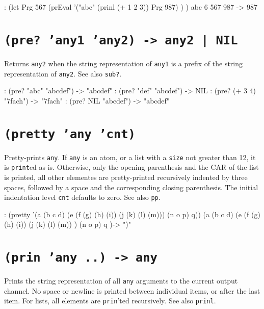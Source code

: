 \begin{wideverbatim}
: (let Prg 567
   (prEval
      '("abc" (prinl (+ 1 2 3)) Prg 987) ) )
abc
6
567
987
-> 987
\end{wideverbatim}

 
\section*{\texttt{(pre? 'any1 'any2) -> any2 | NIL}}
\label{sec:func-ref-P-(pre? 'any1 'any2) -> any2 | NIL}


Returns \texttt{any2} when the string representation of \texttt{any1} is a prefix of
the string representation of \texttt{any2}. See also \texttt{sub?}.


\begin{wideverbatim}
: (pre? "abc" "abcdef")
-> "abcdef"
: (pre? "def" "abcdef")
-> NIL
: (pre? (+ 3 4) "7fach")
-> "7fach"
: (pre? NIL "abcdef")
-> "abcdef"
\end{wideverbatim}

 
\section*{\texttt{(pretty 'any 'cnt)}}
\label{sec:func-ref-P-(pretty 'any 'cnt)}


Pretty-prints \texttt{any}. If \texttt{any} is an atom, or a list with a \texttt{size} not
greater than 12, it is \texttt{print}ed as is. Otherwise, only the opening
parenthesis and the CAR of the list is printed, all other elementes are
pretty-printed recursively indented by three spaces, followed by a space
and the corresponding closing parenthesis. The initial indentation level
\texttt{cnt} defaults to zero. See also \texttt{pp}.


\begin{wideverbatim}
: (pretty '(a (b c d) (e (f (g) (h) (i)) (j (k) (l) (m))) (n o p) q))
(a
   (b c d)
   (e
      (f (g) (h) (i))
      (j (k) (l) (m)) )
   (n o p)
   q )-> ")"
\end{wideverbatim}

 
\section*{\texttt{(prin 'any ..) -> any}}
\label{sec:func-ref-P-(prin 'any ..) -> any}


Prints the string representation of all \texttt{any} arguments to the current
output channel. No space or newline is printed between individual items,
or after the last item. For lists, all elements are \texttt{prin}'ted
recursively. See also \texttt{prinl}.



